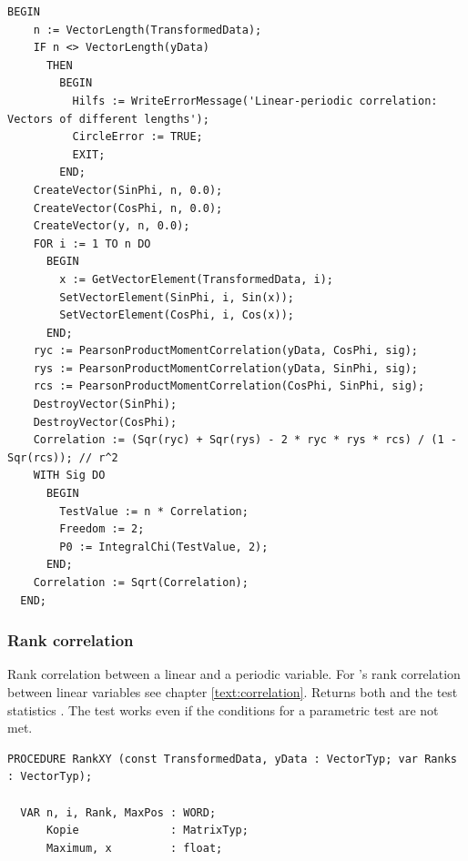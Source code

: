 \begin{refsection}
\begin{lstlisting}[caption=Correlation between linear and circular data]
  BEGIN
    n := VectorLength(TransformedData);
    IF n <> VectorLength(yData)
      THEN
        BEGIN
          Hilfs := WriteErrorMessage('Linear-periodic correlation: Vectors of different lengths');
          CircleError := TRUE;
          EXIT;
        END;
    CreateVector(SinPhi, n, 0.0);
    CreateVector(CosPhi, n, 0.0);
    CreateVector(y, n, 0.0);
    FOR i := 1 TO n DO
      BEGIN
        x := GetVectorElement(TransformedData, i);
        SetVectorElement(SinPhi, i, Sin(x));
        SetVectorElement(CosPhi, i, Cos(x));
      END;
    ryc := PearsonProductMomentCorrelation(yData, CosPhi, sig);
    rys := PearsonProductMomentCorrelation(yData, SinPhi, sig);
    rcs := PearsonProductMomentCorrelation(CosPhi, SinPhi, sig);
    DestroyVector(SinPhi);
    DestroyVector(CosPhi);
    Correlation := (Sqr(ryc) + Sqr(rys) - 2 * ryc * rys * rcs) / (1 - Sqr(rcs)); // r^2
    WITH Sig DO
      BEGIN
        TestValue := n * Correlation;
        Freedom := 2;
        P0 := IntegralChi(TestValue, 2);
      END;
    Correlation := Sqrt(Correlation);
  END;
\end{lstlisting}

\subsubsection{Rank correlation}

Rank correlation between a linear and a periodic variable. For 's rank correlation  between linear variables see chapter \ref{text:correlation}. Returns both  and the test statistics . The test works even if the conditions for a parametric test are not met.

\begin{lstlisting}[caption=Rank correlation between linear and circular data]
  PROCEDURE RankXY (const TransformedData, yData : VectorTyp; var Ranks : VectorTyp);

  VAR n, i, Rank, MaxPos : WORD;
      Kopie              : MatrixTyp;
      Maximum, x         : float;


\end{lstlisting}
\end{refsection}
